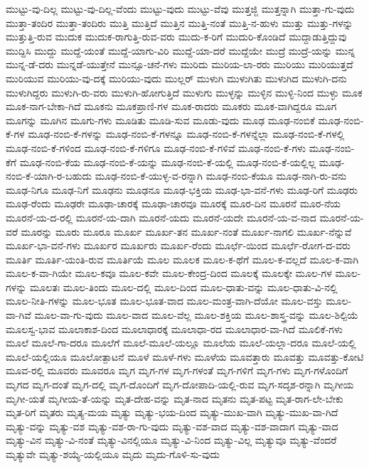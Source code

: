 {ಮುಟ್ಟು-ವು-ದಿಲ್ಲ
ಮುಟ್ಟು-ವು-ದಿಲ್ಲ-ವೆಂದು
ಮುಟ್ಟು-ವುದು
ಮುಟ್ಟು-ವೆವು
ಮುತ್ತಜ್ಜಿ
ಮುತ್ತನ್ನಾಗಿ
ಮುತ್ತಾ-ಗು-ವುದು
ಮುತ್ತಾ-ತಂದಿರ
ಮುತ್ತಾ-ತಂದಿರು
ಮುತ್ತಿ
ಮುತ್ತಿದೆ
ಮುತ್ತಿನ
ಮುತ್ತಿ-ನಂತೆ
ಮುತ್ತಿ-ನ-ಹುಳು
ಮುತ್ತು
ಮುತ್ತು-ಗಳನ್ನು
ಮುತ್ತುತ್ತಿ-ರುವ
ಮುದುಕ
ಮುದುಕ-ರಾಗುತ್ತಿ-ರುವ-ವರು
ಮುದು-ಕ-ರಿಗೆ
ಮುದುರಿ-ಕೊಂಡಿದೆ
ಮುದ್ದಾಡುತ್ತಿದ್ದುವು
ಮುದ್ದಿಸಿ
ಮುದ್ದು
ಮುದ್ದೆ-ಯಂತೆ
ಮುದ್ದೆ-ಯಾಗು-ವಿರಿ
ಮುದ್ದೆ-ಯಾ-ದರೆ
ಮುದ್ದೆಯೇ
ಮುದ್ರೆ
ಮುದ್ರೆ-ಯನ್ನು
ಮುನ್ನ
ಮುನ್ನ-ಡೆ-ದರು
ಮುನ್ನಡೆ-ಯುತ್ತೇನೆ
ಮುನ್ಸೂ-ಚನೆ-ಗಳು
ಮುರಿದು
ಮುರಿಯ-ಲಾ-ರರು
ಮುರಿಯು
ಮುರಿಯುತ್ತದೆ
ಮುರಿಯುವ
ಮುರಿಯು-ವು-ದಕ್ಕೆ
ಮುರಿಯು-ವುದು
ಮುಲ್ಲರ್
ಮುಳುಗಿ
ಮುಳುಗಿತು
ಮುಳುಗಿದ
ಮುಳುಗಿ-ದನು
ಮುಳುಗಿದ್ದರು
ಮುಳುಗಿ-ರು-ವರು
ಮುಳುಗಿ-ಹೋಗುತ್ತಿದೆ
ಮುಳುಗು
ಮುಳ್ಳನ್ನು
ಮುಳ್ಳಿನ
ಮುಳ್ಳಿ-ನಿಂದ
ಮುಳ್ಳು
ಮೂಕ
ಮೂಕ-ನಾಗ-ಬೇಕಾ-ಗಿದೆ
ಮೂಕನು
ಮೂಕಪ್ರಾಣಿ-ಗಳ
ಮೂಕ-ರಾದರು
ಮೂಕರು
ಮೂಕ-ವಾಗಿದ್ದರೂ
ಮೂಗ
ಮೂಗನ್ನು
ಮೂಗಿನ
ಮೂಗು-ಗಳು
ಮೂಡಿತು
ಮೂಡಿ-ಸುವ
ಮೂಡು-ವುದು
ಮೂಢ
ಮೂಢ-ನಂಬಿಕೆ
ಮೂಢ-ನಂಬಿ-ಕೆ-ಗಳ
ಮೂಢ-ನಂಬಿ-ಕೆ-ಗಳನ್ನು
ಮೂಢ-ನಂಬಿ-ಕೆ-ಗಳನ್ನೂ
ಮೂಢ-ನಂಬಿ-ಕೆ-ಗಳನ್ನೆಲ್ಲಾ
ಮೂಢ-ನಂಬಿ-ಕೆ-ಗಳಲ್ಲಿ
ಮೂಢ-ನಂಬಿ-ಕೆ-ಗಳಿಂದ
ಮೂಢ-ನಂಬಿ-ಕೆ-ಗಳಿಗೂ
ಮೂಢ-ನಂಬಿ-ಕೆ-ಗಳಿವೆ
ಮೂಢ-ನಂಬಿ-ಕೆ-ಗಳು
ಮೂಢ-ನಂಬಿ-ಕೆಗೆ
ಮೂಢ-ನಂಬಿ-ಕೆಯ
ಮೂಢ-ನಂಬಿ-ಕೆ-ಯನ್ನು
ಮೂಢ-ನಂಬಿ-ಕೆ-ಯಲ್ಲಿ
ಮೂಢ-ನಂಬಿ-ಕೆ-ಯಲ್ಲಿಲ್ಲ
ಮೂಢ-ನಂಬಿ-ಕೆ-ಯಾಗಿ-ರ-ಬಹುದು
ಮೂಢ-ನಂಬಿ-ಕೆ-ಯುಳ್ಳ-ವ-ರನ್ನಾಗಿ
ಮೂಢ-ನಂಬಿ-ಕೆಯೂ
ಮೂಢ-ನಾಗಿ-ರು-ವನು
ಮೂಢ-ನಿಗೂ
ಮೂಢ-ನಿಗೆ
ಮೂಢನು
ಮೂಢನೂ
ಮೂಢ-ಭಕ್ತಿಯ
ಮೂಢ-ಭಾ-ವನೆ-ಗಳು
ಮೂಢ-ರಿಗೆ
ಮೂಢರು
ಮೂಢ-ರೆಂದು
ಮೂಢರೇ
ಮೂಢಾ-ಚಾರಕ್ಕೆ
ಮೂಢಾ-ಚಾರವೂ
ಮೂರಕ್ಕೆ
ಮೂರ-ದಿನ
ಮೂರನೆ
ಮೂರ-ನೆಯ
ಮೂರನೆ-ಯ-ದ-ರಲ್ಲಿ
ಮೂರನೆ-ಯ-ದಾಗಿ
ಮೂರನೆ-ಯದು
ಮೂರನೆ-ಯದೇ
ಮೂರನೆ-ಯ-ವ-ನಾದ
ಮೂರನೆ-ಯ-ವರೆ
ಮೂರನ್ನು
ಮೂರು
ಮೂರೂ
ಮೂರ್ಖ
ಮೂರ್ಖ-ತನ
ಮೂರ್ಖ-ನಂತೆ
ಮೂರ್ಖ-ನಾಗಲಿ
ಮೂರ್ಖ-ನೆನ್ನುವೆ
ಮೂರ್ಖ-ಭಾ-ವನೆ-ಗಳು
ಮೂರ್ಖರ
ಮೂರ್ಖರು
ಮೂರ್ಖ-ರೆಂದು
ಮೂರ್ಛೆ-ಯಿಂದ
ಮೂರ್ಛೆ-ರೋಗ-ದ-ವರು
ಮೂರ್ತಿ
ಮೂರ್ತಿ-ಯಂತಿ-ರುವ
ಮೂರ್ತಿಯೆ
ಮೂಲ
ಮೂಲಕ
ಮೂಲ-ಕ-ಥೆಗೆ
ಮೂಲ-ಕ-ವಲ್ಲದೆ
ಮೂಲ-ಕ-ವಾಗಿ
ಮೂಲ-ಕ-ವಾ-ಗಿಯೇ
ಮೂಲ-ಕವೂ
ಮೂಲ-ಕವೇ
ಮೂಲ-ಕೇಂದ್ರ-ದಿಂದ
ಮೂಲಕ್ಕೆ
ಮೂಲಕ್ಕೇ
ಮೂಲ-ಗಳ
ಮೂಲ-ಗಳನ್ನು
ಮೂಲತಃ
ಮೂಲ-ತಿಂದು
ಮೂಲ-ದಲ್ಲಿ
ಮೂಲ-ದಿಂದ
ಮೂಲ-ಧಾತು-ವನ್ನು
ಮೂಲ-ಧಾತು-ವಿ-ನಲ್ಲಿ
ಮೂಲ-ನೀತಿ-ಗಳನ್ನು
ಮೂಲ-ಭೂತ
ಮೂಲ-ಭೂತ-ವಾದ
ಮೂಲ-ಮಂತ್ರ-ವಾಗಿ-ದೆಯೋ
ಮೂಲ-ವಸ್ತು
ಮೂಲ-ವಾ-ಗಿವೆ
ಮೂಲ-ವಾ-ಗು-ವುದು
ಮೂಲ-ವಾದ
ಮೂಲ-ವೆಲ್ಲ
ಮೂಲ-ಶಕ್ತಿಯ
ಮೂಲ-ಶಾಸ್ತ್ರ-ವನ್ನು
ಮೂಲ-ಶಿಲ್ಪಿಯೆ
ಮೂಲಸ್ವ-ಭಾವ
ಮೂಲಾಕಾಶ-ದಿಂದ
ಮೂಲಾಧಾರಕ್ಕೆ
ಮೂಲಾಧಾ-ರದ
ಮೂಲಾಧಾರ-ವಾ-ಗಿದೆ
ಮೂಲಿಕೆ-ಗಳು
ಮೂಲೆ
ಮೂಲೆ-ಗಾ-ದರೂ
ಮೂಲೆಗೆ
ಮೂಲೆ-ಮೂಲೆ-ಯಲ್ಲೂ
ಮೂಲೆಯ
ಮೂಲೆ-ಯಲ್ಲಾ-ದರೂ
ಮೂಲೆ-ಯಲ್ಲಿ
ಮೂಲೆ-ಯಲ್ಲಿಯೂ
ಮೂಲೋತ್ಪಾಟನೆ
ಮೂಳೆ
ಮೂಳೆ-ಗಳು
ಮೂಳೆಯ
ಮೂವತ್ತಾರು
ಮೂವತ್ತು
ಮೂವತ್ತು-ಕೋಟಿ
ಮೂವ-ರಲ್ಲಿ
ಮೂವರು
ಮೂವರೂ
ಮೃಗ
ಮೃಗ-ಗಳ
ಮೃಗ-ಗಳಂತೆ
ಮೃಗ-ಗಳಿಗೆ
ಮೃಗ-ಗಳು
ಮೃಗ-ಗಳೊಂದಿಗೆ
ಮೃಗದ
ಮೃಗ-ದಂತೆ
ಮೃಗ-ದಲ್ಲಿ
ಮೃಗ-ದೊಂದಿಗೆ
ಮೃಗ-ದೋಪಾದಿ-ಯಲ್ಲಿ-ರುವ
ಮೃಗ-ಸದೃಶ-ರನ್ನಾಗಿ
ಮೃಗೀಯ
ಮೃಗೀ-ಯತೆ
ಮೃಗೀಯ-ತೆ-ಯನ್ನು
ಮೃತ-ದೇಹ-ವನ್ನು
ಮೃತ-ನಾದ
ಮೃತನು
ಮೃತ-ಪಟ್ಟ
ಮೃತ-ರಾಗ-ಲೇ-ಬೇಕು
ಮೃತ-ರಿಗೆ
ಮೃತರು
ಮೃತ್ಯ-ಮಯ
ಮೃತ್ಯು
ಮೃತ್ಯು-ಭಯ-ದಿಂದ
ಮೃತ್ಯು-ಮುಖ-ವಾಗಿ
ಮೃತ್ಯು-ಮುಖ-ವಾ-ಗಿದೆ
ಮೃತ್ಯು-ವನ್ನು
ಮೃತ್ಯು-ವಶ
ಮೃತ್ಯು-ವಶ-ರಾ-ಗು-ವುದು
ಮೃತ್ಯು-ವಶ-ವಾದ
ಮೃತ್ಯು-ವಶ-ವಾದಾಗ
ಮೃತ್ಯು-ವಾದ
ಮೃತ್ಯು-ವಿನ
ಮೃತ್ಯು-ವಿ-ನಂತೆ
ಮೃತ್ಯು-ವಿನಲ್ಲಿಯೂ
ಮೃತ್ಯು-ವಿ-ನಿಂದ
ಮೃತ್ಯು-ವಿಲ್ಲ
ಮೃತ್ಯುವೂ
ಮೃತ್ಯು-ವೆಂದರೆ
ಮೃತ್ಯುವೇ
ಮೃತ್ಯು-ಶಯ್ಯೆ-ಯಲ್ಲಿಯೂ
ಮೃದು
ಮೃದು-ಗೊಳಿ-ಸು-ವುದು
}
